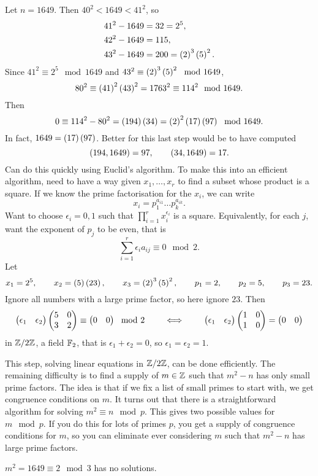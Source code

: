 \begin{example*}
Let $ n = 1649 $. Then $ 40^2 < 1649 < 41^2 $, so
\begin{align*}
41^2 - 1649 & = 32 = 2^5, \\
42^2 - 1649 & = 115, \\
43^2 - 1649 & = 200 = \br{2}^3\br{5}^2.
\end{align*}
Since $ 41^2 \equiv 2^5 \mod 1649 $ and $ 43^2 \equiv \br{2}^3\br{5}^2 \mod 1649 $,
$$ 80^2 \equiv \br{41}^2\br{43}^2 = 1763^2 \equiv 114^2 \mod 1649. $$
Then
$$ 0 \equiv 114^2 - 80^2 = \br{194}\br{34} = \br{2}^2\br{17}\br{97} \mod 1649. $$
In fact, $ 1649 = \br{17}\br{97} $. Better for this last step would be to have computed
$$ \br{194, 1649} = 97, \qquad \br{34, 1649} = 17. $$
Can do this quickly using Euclid's algorithm. To make this into an efficient algorithm, need to have a way given $ x_1, \dots, x_r $ to find a subset whose product is a square. If we know the prime factorisation for the $ x_i $, we can write
$$ x_i = p_1^{a_{i1}} \dots p_k^{a_{ik}}. $$
Want to choose $ \epsilon_i = 0, 1 $ such that $ \prod_{i = 1}^r x_i^{\epsilon_i} $ is a square. Equivalently, for each $ j $, want the exponent of $ p_j $ to be even, that is
$$ \sum_{i = 1}^r \epsilon_ia_{ij} \equiv 0 \mod 2. $$
Let
$$ x_1 = 2^5, \qquad x_2 = \br{5}\br{23}, \qquad x_3 = \br{2}^3\br{5}^2, \qquad p_1 = 2, \qquad p_2 = 5, \qquad p_3 = 23. $$
Ignore all numbers with a large prime factor, so here ignore $ 23 $. Then
$$ \begin{pmatrix} \epsilon_1 & \epsilon_2 \end{pmatrix}\begin{pmatrix} 5 & 0 \\ 3 & 2 \end{pmatrix} \equiv \begin{pmatrix} 0 & 0 \end{pmatrix} \mod 2 \qquad \iff \qquad \begin{pmatrix} \epsilon_1 & \epsilon_2 \end{pmatrix}\begin{pmatrix} 1 & 0 \\ 1 & 0 \end{pmatrix} = \begin{pmatrix} 0 & 0 \end{pmatrix} $$
in $ \mathbb{Z} / 2\mathbb{Z} $, a field $ \mathbb{F}_2 $, that is $ \epsilon_1 + \epsilon_2 = 0 $, so $ \epsilon_1 = \epsilon_2 = 1 $.
\end{example*}

This step, solving linear equations in $ \mathbb{Z} / 2\mathbb{Z} $, can be done efficiently. The remaining difficulty is to find a supply of $ m \in \mathbb{Z} $ such that $ m^2 - n $ has only small prime factors. The idea is that if we fix a list of small primes to start with, we get congruence conditions on $ m $. It turns out that there is a straightforward algorithm for solving $ m^2 \equiv n \mod p $. This gives two possible values for $ m \mod p $. If you do this for lots of primes $ p $, you get a supply of congruence conditions for $ m $, so you can eliminate ever considering $ m $ such that $ m^2 - n $ has large prime factors.

\begin{example*}
$ m^2 = 1649 \equiv 2 \mod 3 $ has no solutions.
\end{example*}

